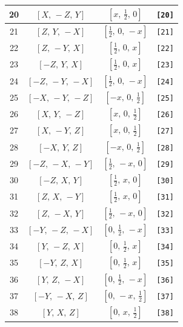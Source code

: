 \documentclass[fleqn,8pt]{jsarticle}
\begin{document}
\begin{longtable}{cccc}
20 & $\left[ X,\, - Z,\, Y \right]$ & $\left[ x,\, \frac{1}{2},\, 0 \right]$ & {\tt [20]} \\ \hline
21 & $\left[ Z,\, Y,\, - X \right]$ & $\left[ \frac{1}{2},\, 0,\, - x \right]$ & {\tt [21]} \\ \hline
22 & $\left[ Z,\, - Y,\, X \right]$ & $\left[ \frac{1}{2},\, 0,\, x \right]$ & {\tt [22]} \\ \hline
23 & $\left[ - Z,\, Y,\, X \right]$ & $\left[ \frac{1}{2},\, 0,\, x \right]$ & {\tt [23]} \\ \hline
24 & $\left[ - Z,\, - Y,\, - X \right]$ & $\left[ \frac{1}{2},\, 0,\, - x \right]$ & {\tt [24]} \\ \hline
25 & $\left[ - X,\, - Y,\, - Z \right]$ & $\left[ - x,\, 0,\, \frac{1}{2} \right]$ & {\tt [25]} \\ \hline
26 & $\left[ X,\, Y,\, - Z \right]$ & $\left[ x,\, 0,\, \frac{1}{2} \right]$ & {\tt [26]} \\ \hline
27 & $\left[ X,\, - Y,\, Z \right]$ & $\left[ x,\, 0,\, \frac{1}{2} \right]$ & {\tt [27]} \\ \hline
28 & $\left[ - X,\, Y,\, Z \right]$ & $\left[ - x,\, 0,\, \frac{1}{2} \right]$ & {\tt [28]} \\ \hline
29 & $\left[ - Z,\, - X,\, - Y \right]$ & $\left[ \frac{1}{2},\, - x,\, 0 \right]$ & {\tt [29]} \\ \hline
30 & $\left[ - Z,\, X,\, Y \right]$ & $\left[ \frac{1}{2},\, x,\, 0 \right]$ & {\tt [30]} \\ \hline
31 & $\left[ Z,\, X,\, - Y \right]$ & $\left[ \frac{1}{2},\, x,\, 0 \right]$ & {\tt [31]} \\ \hline
32 & $\left[ Z,\, - X,\, Y \right]$ & $\left[ \frac{1}{2},\, - x,\, 0 \right]$ & {\tt [32]} \\ \hline
33 & $\left[ - Y,\, - Z,\, - X \right]$ & $\left[ 0,\, \frac{1}{2},\, - x \right]$ & {\tt [33]} \\ \hline
34 & $\left[ Y,\, - Z,\, X \right]$ & $\left[ 0,\, \frac{1}{2},\, x \right]$ & {\tt [34]} \\ \hline
35 & $\left[ - Y,\, Z,\, X \right]$ & $\left[ 0,\, \frac{1}{2},\, x \right]$ & {\tt [35]} \\ \hline
36 & $\left[ Y,\, Z,\, - X \right]$ & $\left[ 0,\, \frac{1}{2},\, - x \right]$ & {\tt [36]} \\ \hline
37 & $\left[ - Y,\, - X,\, Z \right]$ & $\left[ 0,\, - x,\, \frac{1}{2} \right]$ & {\tt [37]} \\ \hline
38 & $\left[ Y,\, X,\, Z \right]$ & $\left[ 0,\, x,\, \frac{1}{2} \right]$ & {\tt [38]} \\ \hline

\end{longtable}
\end{document}
